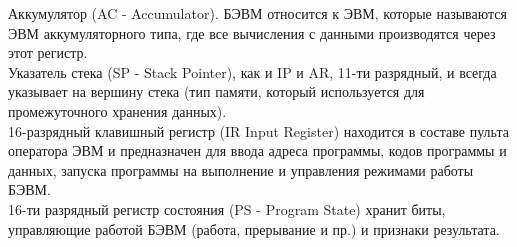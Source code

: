 Аккумулятор (AC - Accumulator). БЭВМ относится к ЭВМ, которые называются ЭВМ аккумуляторного типа, где все вычисления с данными производятся через этот регистр. \\
Указатель стека (SP - Stack Pointer), как и IP и AR, 11-ти разрядный, и всегда указывает на вершину стека (тип памяти, который используется для промежуточного хранения данных). \\
16-разрядный клавишный регистр (IR Input Register) находится в составе пульта оператора ЭВМ и предназначен для ввода адреса программы, кодов программы и данных, запуска программы на выполнение и управления режимами работы БЭВМ. \\
16-ти разрядный регистр состояния (PS - Program State) хранит биты, управляющие работой БЭВМ (работа, прерывание и пр.) и признаки результата. \\

